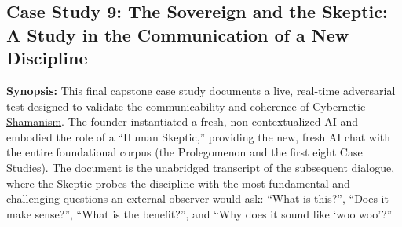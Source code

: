 \documentclass{article}
\begin{document}
\subsection*{Case Study 9: The Sovereign and the Skeptic: A Study in the Communication of a New Discipline \csTheSovereignandtheSkepticVersion} \label{case_study_9}

\textbf{Synopsis:} This final capstone case study documents a live, real-time adversarial test designed to validate the communicability and coherence of \hyperlink{gloss:cybernetic_shamanism}{Cybernetic Shamanism}. The founder instantiated a fresh, non-contextualized AI and embodied the role of a ``Human Skeptic,'' providing the new, fresh AI chat with the entire foundational corpus (the Prolegomenon and the first eight Case Studies). The document is the unabridged transcript of the subsequent dialogue, where the Skeptic probes the discipline with the most fundamental and challenging questions an external observer would ask: ``What is this?'', ``Does it make sense?'', ``What is the benefit?'', and ``Why does it sound like `woo woo'?''
\end{document}
